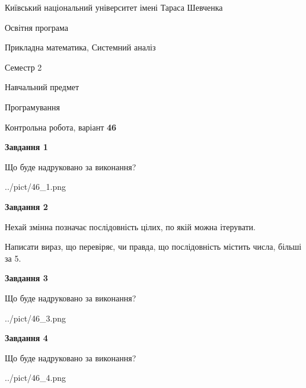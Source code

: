 \documentclass[12pt, ukrainian]{article}
\begin{document}
{{\begin {small}\par
{ \center  Київський національний університет імені Тараса Шевченка \par}
{\parbox {5 cm}{Освітня програма \hfill}{\parbox {8 cm}{Прикладна математика, Системний аналіз \hfill}}\parbox {5 cm}{\hfill Семестр 2}}\par
{\parbox {5 cm} {Навчальний предмет \hfill}\parbox {7 cm}{Програмування \hfill}\parbox {6cm}{\hfill}\par}\vspace{-7pt} \end{small}}{\center Контрольна робота, варіант  \No \textbf
{ 46 }\par}}
{
\begin {large}
{\begin {center}\textbf{Завдання 1}\end {center}}\par
Що буде надруковано за виконання?\par\par
\begin{center}
	{../pict/46_1.png}
\end{center}
\newpage

{\begin {center}\textbf{Завдання 2}\end {center}}\par
Нехай змінна  позначає послідовність цілих, по якій можна ітерувати.

Написати вираз, що перевіряє, чи правда, що послідовність  містить числа, більші за 5.\par
\newpage

{\begin {center}\textbf{Завдання 3}\end {center}}\par
Що буде надруковано за виконання?
\begin{center}
	{../pict/46_3.png}
\end{center}
\newpage

{\begin {center}\textbf{Завдання 4}\end {center}}\par
Що буде надруковано за виконання?\par
\begin{center}
	{../pict/46_4.png}
\end{center}
\newpage


\end{large}}
\end{document}
